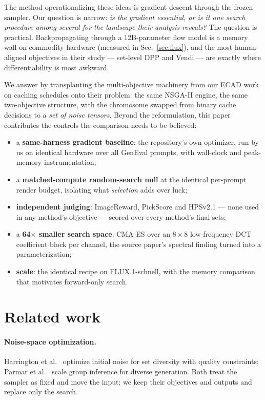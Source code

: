 \documentclass[10pt,twocolumn,letterpaper]{article}
\begin{document}
The method operationalizing these ideas is gradient descent through the
frozen sampler. Our question is narrow: \emph{is the gradient essential, or is
it one search procedure among several for the landscape their analysis
reveals?} The question is practical. Backpropagating through a 12B-parameter
flow model is a memory wall on commodity hardware
\ifdefined\nbGradFluxPeakSixteen(measured in Sec.~\ref{sec:flux})\fi, and the
most human-aligned objectives in their study --- set-level DPP and Vendi ---
are exactly where differentiability is most awkward.

We answer by transplanting the multi-objective machinery from our ECAD work on
caching schedules \cite{aggarwal2026ecad} onto their problem: the same NSGA-II
\cite{deb2002nsga2} engine, the same two-objective structure, with the
chromosome swapped from binary cache decisions to a \emph{set of noise
tensors}. Beyond the reformulation, this paper contributes the controls the
comparison needs to be believed:

\begin{itemize}\setlength\itemsep{0.1em}
\item a \textbf{same-harness gradient baseline}: the repository's own
optimizer, run by us on identical hardware over all \nbNumPrompts{} GenEval
prompts, with wall-clock and peak-memory instrumentation;
\item a \textbf{matched-compute random-search null} at the identical
per-prompt render budget, isolating what \emph{selection} adds over luck;
\item \textbf{independent judging}: ImageReward, PickScore and HPSv2.1 ---
none used in any method's objective --- scored over every method's final sets;
\item a \textbf{64$\times$ smaller search space}: CMA-ES over an $8{\times}8$
low-frequency DCT coefficient block per channel, the source paper's spectral
finding turned into a parameterization;
\item \textbf{scale}: the identical recipe on FLUX.1-schnell, with the
memory comparison that motivates forward-only search.
\end{itemize}

\section{Related work}

\paragraph{Noise-space optimization.} Harrington et
al.~\cite{harrington2026never} optimize initial noise for set diversity with
quality constraints; Parmar et al.~\cite{parmar2025scaling} scale group
inference for diverse generation. Both treat the sampler as fixed and move the
input; we keep their objectives and outputs and replace only the search.
\end{document}
